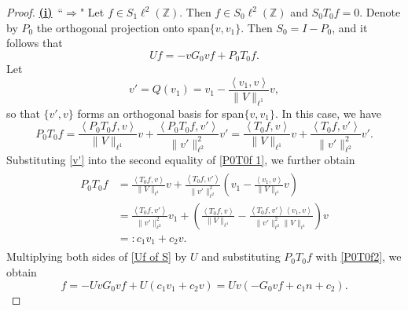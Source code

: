 \documentclass[reqno, 11pt]{amsart}
\newcommand\Z{\mathbb{Z}}
\numberwithin{equation}{section}
\begin{document}
\begin{proof}
{\textbf{\underline{(i)}}}~``$\bm{\Longrightarrow}$"  Let $f\in S_1\ell^2(\Z)$. Then $f\in S_0\ell^2(\Z)$ and $S_0T_0f=0$. Denote by $P_0$ the orthogonal projection onto span$\{v,v_1\}$. Then $S_0=I-P_0$, and it follows that
\begin{equation}\label{Uf of S}
Uf=-vG_0vf+P_0T_0f.
\end{equation}
Let
\begin{equation}\label{v'}
v'=Q(v_1)=v_1-\frac{\left<v_1,v\right>}{\|V\|_{\ell^1}}v,
\end{equation}
so that $\{v',v\}$ forms an orthogonal basis for span$\{v,v_1\}$. In this case, we have
\begin{equation}\label{P0T0f 1}
P_0T_0f=\frac{\left<P_0T_0f,v\right>}{\|V\|_{\ell^1}}v+\frac{\left<P_0T_0f,v'\right>}{\|v'\|^2_{\ell^2}}v'=\frac{\left<T_0f,v\right>}{\|V\|_{\ell^1}}v+\frac{\left<T_0f,v'\right>}{\|v'\|^2_{\ell^2}}v'.
\end{equation}
Substituting \eqref{v'} into the second equality of \eqref{P0T0f 1}, we further obtain 
\begin{align}\label{P0T0f2}
\begin{split}
P_0T_0f&=\frac{\left<T_0f,v\right>}{\|V\|_{\ell^1}}v+\frac{\left<T_0f,v'\right>}{\|v'\|^2_{\ell^2}}\left(v_1-\frac{\left<v_1,v\right>}{\|V\|_{\ell^1}}v\right)\\
&=\frac{\left<T_0f,v'\right>}{\|v'\|^2_{\ell^2}}v_1+\left(\frac{\left<T_0f,v\right>}{\|V\|_{\ell^1}}-\frac{\left<T_0f,v'\right>\left<v_1,v\right>}{\|v'\|^2_{\ell^2}\|V\|_{\ell^1}}\right)v\\
&=:c_1v_1+c_2v.
\end{split}
\end{align}
Multiplying both sides of \eqref{Uf of S} by $U$ and substituting $P_0T_0f$ with \eqref{P0T0f2}, we obtain
 $$f=-UvG_0vf+U(c_1v_1+c_2v)=Uv(-G_0vf+c_1n+c_2).$$


\end{proof}
\end{document}
